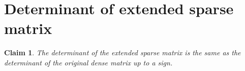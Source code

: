 \documentclass[final,leqno]{siamltex}
\newtheorem{claim}[theorem]{Claim}
\begin{document}

\section{Determinant of extended sparse matrix}


\begin{claim}
The determinant of the extended sparse matrix is the same as the determinant of the original dense matrix up to a sign.
\end{claim}
\end{document}
